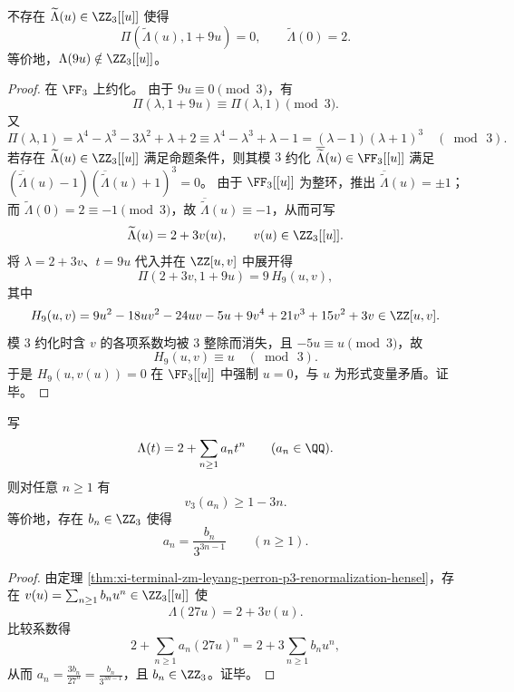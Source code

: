 \begin{proposition}[\texorpdfstring{$27$}{27} 的最小性：\texorpdfstring{$t=9u$}{t=9u} 不产生 \texorpdfstring{$3$}{3}-进整系数展开]\label{prop:xi-terminal-zm-leyang-perron-p3-minimal-27}
不存在 \(\widetilde\Lambda(u)\in\ZZ_3[[u]]\) 使得
\[
\Pi(\widetilde\Lambda(u),1+9u)=0,\qquad \widetilde\Lambda(0)=2.
\]
等价地，\(\Lambda(9u)\notin\ZZ_3[[u]]\)。
\end{proposition}
\begin{proof}
在 \(\FF_3\) 上约化。
由于 \(9u\equiv 0\pmod 3\)，有
\[
\Pi(\lambda,1+9u)\equiv \Pi(\lambda,1)\pmod 3.
\]
又
\[
\Pi(\lambda,1)=\lambda^4-\lambda^3-3\lambda^2+\lambda+2\equiv \lambda^4-\lambda^3+\lambda-1
=(\lambda-1)(\lambda+1)^3\quad(\bmod\,3).
\]
若存在 \(\widetilde\Lambda(u)\in\ZZ_3[[u]]\) 满足命题条件，则其模 \(3\) 约化 \(\overline{\widetilde\Lambda}(u)\in\FF_3[[u]]\) 满足
\((\overline{\widetilde\Lambda}(u)-1)(\overline{\widetilde\Lambda}(u)+1)^3=0\)。
由于 \(\FF_3[[u]]\) 为整环，推出 \(\overline{\widetilde\Lambda}(u)=\pm 1\)；
而 \(\widetilde\Lambda(0)=2\equiv-1\pmod 3\)，故 \(\overline{\widetilde\Lambda}(u)\equiv-1\)，从而可写
\[
\widetilde\Lambda(u)=2+3v(u),\qquad v(u)\in\ZZ_3[[u]].
\]
将 \(\lambda=2+3v\)、\(t=9u\) 代入并在 \(\ZZ[u,v]\) 中展开得
\[
\Pi(2+3v,1+9u)=9\,H_9(u,v),
\]
其中
\[
H_9(u,v)=9u^{2}-18uv^{2}-24uv-5u+9v^{4}+21v^{3}+15v^{2}+3v\in\ZZ[u,v].
\]
模 \(3\) 约化时含 \(v\) 的各项系数均被 \(3\) 整除而消失，且 \(-5u\equiv u\pmod 3\)，故
\[
H_9(u,v)\equiv u\quad(\bmod\,3).
\]
于是 \(H_9(u,v(u))=0\) 在 \(\FF_3[[u]]\) 中强制 \(u=0\)，与 \(u\) 为形式变量矛盾。证毕。
\end{proof}

\begin{corollary}\label{cor:xi-terminal-zm-leyang-perron-v3-linear-bound}
写
\[
\Lambda(t)=2+\sum_{n\ge 1}a_n t^n\qquad(a_n\in\QQ).
\]
则对任意 \(n\ge 1\) 有
\[
v_3(a_n)\ge 1-3n.
\]
等价地，存在 \(b_n\in\ZZ_3\) 使得
\[
a_n=\frac{b_n}{3^{3n-1}}\qquad(n\ge 1).
\]
\end{corollary}
\begin{proof}
由定理 \ref{thm:xi-terminal-zm-leyang-perron-p3-renormalization-hensel}，存在 \(v(u)=\sum_{n\ge 1}b_nu^n\in\ZZ_3[[u]]\) 使
\[
\Lambda(27u)=2+3v(u).
\]
比较系数得
\[
2+\sum_{n\ge 1}a_n(27u)^n
=2+3\sum_{n\ge 1}b_nu^n,
\]
从而 \(a_n=\frac{3b_n}{27^n}=\frac{b_n}{3^{3n-1}}\)，且 \(b_n\in\ZZ_3\)。证毕。
\end{proof}

